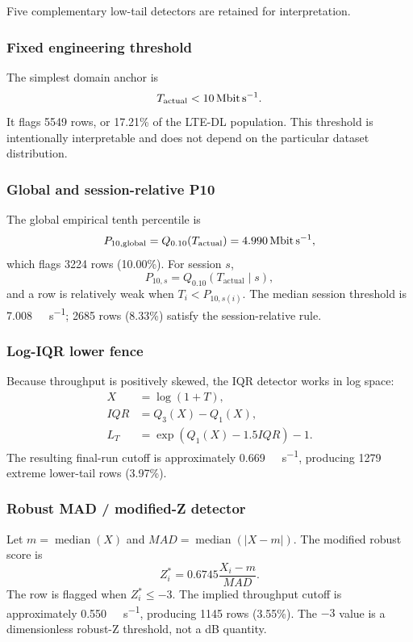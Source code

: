 Five complementary low-tail detectors are retained for interpretation.

\subsubsection{Fixed engineering threshold}
The simplest domain anchor is
\begin{equation}
T_{\mathrm{actual}} < \SI{10}{\mega\bit\per\second}.
\end{equation}
It flags \num{5549} rows, or 17.21\% of the LTE-DL population. This threshold is intentionally interpretable and does not depend on the particular dataset distribution.

\subsubsection{Global and session-relative P10}
The global empirical tenth percentile is
\begin{equation}
P_{10,\mathrm{global}} = Q_{0.10}(T_{\mathrm{actual}}) = \SI{4.990}{\mega\bit\per\second},
\end{equation}
which flags \num{3224} rows (10.00\%). For session $s$,
\begin{equation}
P_{10,s}=Q_{0.10}(T_{\mathrm{actual}}\mid s),
\end{equation}
and a row is relatively weak when $T_i<P_{10,s(i)}$. The median session threshold is \SI{7.008}{\mega\bit\per\second}; \num{2685} rows (8.33\%) satisfy the session-relative rule.

\subsubsection{Log-IQR lower fence}
Because throughput is positively skewed, the IQR detector works in log space:
\begin{align}
X &= \log(1+T),\\
IQR &= Q_3(X)-Q_1(X),\\
L_T &= \exp\!\left(Q_1(X)-1.5IQR\right)-1.
\end{align}
The resulting final-run cutoff is approximately \SI{0.669}{\mega\bit\per\second}, producing \num{1279} extreme lower-tail rows (3.97\%).

\subsubsection{Robust MAD / modified-Z detector}
Let $m=\operatorname{median}(X)$ and $MAD=\operatorname{median}(|X-m|)$. The modified robust score is
\begin{equation}
Z_i^{*}=0.6745\frac{X_i-m}{MAD}.
\end{equation}
The row is flagged when $Z_i^{*}\leq -3$. The implied throughput cutoff is approximately \SI{0.550}{\mega\bit\per\second}, producing \num{1145} rows (3.55\%). The $-3$ value is a dimensionless robust-Z threshold, not a dB quantity.

